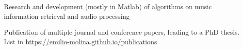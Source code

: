 \documentclass[]{deedy-resume-openfont}
\begin{document}
\begin{minipage}[t]{0.66\textwidth}
\begin{tightemize}
\item Research and development (mostly in Matlab) of algorithms on music information retrieval and audio processing
\item Publication of multiple journal and conference papers, leading to a PhD thesis. List in \href{https://emilio-molina.github.io/publications}{https://emilio-molina.github.io/publications}
\end{tightemize}
\sectionsep





\end{minipage}
\end{document}
